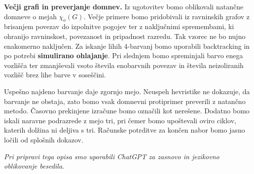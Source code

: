 \documentclass[10pt,a4paper]{article}
\begin{document}
\textbf{Večji grafi in preverjanje domnev.} Iz ugotovitev bomo oblikovali natančne domneve o mejah $\chi_o(G)$. Večje primere bomo pridobivali iz ravninskih grafov z brisanjem povezav do izpolnitve pogojev ter z naključnimi spremembami, ki ohranijo ravninskost, povezanost in pripadnost razredu. Tak vzorec ne bo nujno enakomerno naključen. Za iskanje lihih 4-barvanj bomo uporabili backtracking in po potrebi \textbf{simulirano ohlajanje}. Pri slednjem bomo spreminjali barvo enega vozlišča ter zmanjševali vsoto števila enobarvnih povezav in števila neizoliranih vozlišč brez lihe barve v soseščini.

Uspešno najdeno barvanje daje zgornjo mejo. Neuspeh hevristike ne dokazuje, da barvanje ne obstaja, zato bomo vsak domnevni protiprimer preverili z natančno metodo. Časovno prekinjene izračune bomo označili kot nerešene. Dodatno bomo iskali naravne podrazrede z mejo tri, pri čemer bomo upoštevali oviro ciklov, katerih dolžina ni deljiva s tri. Računske potrditve za končen nabor bomo jasno ločili od splošnih dokazov.

\begingroup\small

\emph{Pri pripravi tega opisa smo uporabili ChatGPT za zasnovo in jezikovno oblikovanje besedila.}

\endgroup
\end{document}
